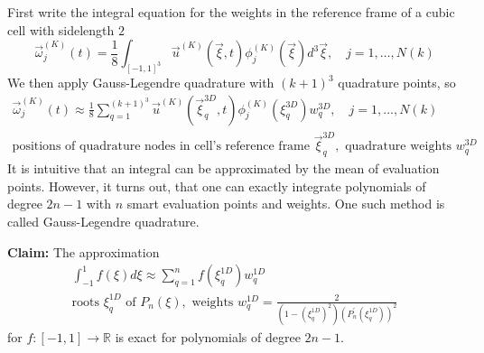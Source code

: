 First write the integral equation for the weights in the reference frame of a cubic cell with sidelength $2$
\begin{equation}
    \vec{\omega}_j^{(K)}(t)=\frac{1}{8} \int_{[-1,1]^3} \vec{u}^{(K)}(\vec{\xi}, t) \phi_j^{(K)}(\vec{\xi}) d^3 \vec{\xi}, \quad j=1, \ldots, N(k)
\end{equation}
We then apply Gauss-Legendre quadrature with $(k+1)^3$ quadrature points, so
\begin{equation}
    \label{eq:dg_weights}
    \begin{gathered}
        \vec{\omega}_j^{(K)}(t) \approx \frac{1}{8} \sum_{q=1}^{(k+1)^3} \vec{u}^{(K)}\left(\vec{\xi}_q^{3 D}, t\right) \phi_j^{(K)}\left(\xi_q^{3 D}\right) w_q^{3 D}, \quad j=1, \ldots, N(k) \\
        \text{positions of quadrature nodes in cell's reference frame } \vec{\xi}_q^{3 D}, \text{ quadrature weights } w_q^{3 D}
    \end{gathered}
\end{equation}
It is intuitive that an integral can be approximated by the mean of evaluation points.
However, it turns out, that one can exactly integrate polynomials of degree $2n-1$ with $n$ smart
evaluation points and weights. One such method is called Gauss-Legendre quadrature.

\textbf{Claim: } The approximation
\begin{equation}
    \begin{gathered}
        \int_{-1}^1 f(\xi) d \xi \approx \sum_{q=1}^n f\left(\xi_q^{1 D}\right) w_q^{1 D} \\
        \text{roots } \xi_q^{1 D} \text{ of } P_n(\xi), \text{ weights } w_q^{1 D}=\frac{2}{\left(1-\left( \xi_{q}^{1 D} \right)^2\right)\left(P_{n}^{\prime}\left(\xi_{q}^{1 D}\right)\right)^{2}}
    \end{gathered}
\end{equation}
for $f: [-1,1] \rightarrow \mathbb{R}$ is exact for polynomials of degree $2n-1$.

